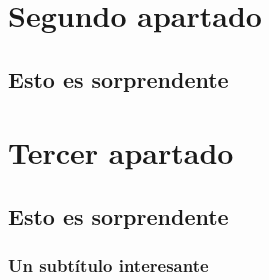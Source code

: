 
\section{Segundo apartado}
   \lipsum[1]
   \subsection{Esto es sorprendente}
   \lipsum[2]
\section{Tercer apartado}
\subsection{Esto es sorprendente}
\lipsum[3-4]
\subsubsection{Un subtítulo interesante}
\lipsum[5-7]
